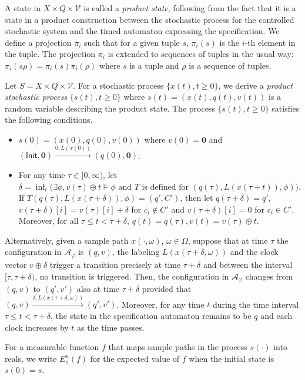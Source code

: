 \documentclass[letterpaper, 10 pt, conference]{ieeeconf}
\newcommand{\calA}{\mathcal{A}}
\newcommand{\calV}{\mathcal{V}}
\newcommand{\init}{\mathsf{Init}}
\begin{document}
A state in $X\times Q\times \calV$ is called a \emph{product state},
following from the fact that it is a state in a product construction
between the stochastic process for the controlled stochastic system
and the timed automaton expressing the specification. We define a
projection $\pi_i$ such that for a given tuple $s$, $\pi_i(s)$ is the
$i$-th element in the tuple. The projection $\pi_i$ is extended to
sequences of tuples in the usual way:
$\pi_i(s\rho)= \pi_i(s)\pi_i(\rho)$ where $s$ is a tuple and $\rho$ is
a sequence of tuples.

Let $S= X\times Q\times \calV$. For a stochastic process
$\{x(t), t\ge 0 \}$, we derive a \emph{product stochastic process}
$\{s(t), t\ge 0\}$ where $s(t)= (x(t), q(t), v(t))$ is a random
variable describing the product state. The process $\{s(t), t\ge 0
\}$ satisfies the following conditions.
\begin{itemize}
\item $s(0)= (x(0), q(0),v(0))$ where $v(0) =\bm 0$ and
  $(\init,\bm 0 )\xrightarrow{0, L(x(0))}(q(0),\bm 0)$.
\item For any time $\tau \in [0,\infty)$, let
  $\delta= \inf_t\big(\exists \phi, v(\tau)\oplus t \models \phi
  \text{ and } T \text{ is defined for }(q(\tau), L(x(\tau+t)),
  \phi)\big)$.
  If $T(q(\tau), L(x(\tau+\delta)), \phi)=(q',C')$, then let
  $q(\tau+\delta)=q'$, $v(\tau+\delta)[i]=v(\tau)[i]+\delta$ for
  $c_i \notin C'$ and $v(\tau+\delta)[i]=0$ for $c_i\in C'$. Moreover,
  for all $\tau \le t < \tau + \delta$,
  $q(t)=q(\tau), v(t)=v(\tau)\oplus t$.
\end{itemize}

Alternatively, given a sample path $x(\cdot,\omega)$,
$\omega \in \Omega$, suppose that at time $\tau$ the configuration in
$\calA_\varphi$ is $(q,v)$, the labeling $L(x(\tau+\delta,\omega))$
and the clock vector $v\oplus \delta$ trigger a transition precisely
at time $\tau+\delta$ and between the interval $[\tau, \tau+\delta)$,
no transition is triggered. Then, the configuration in $\calA_\varphi$
changes from $(q,v)$ to $(q',v')$ also at time $\tau+\delta$ provided
that $(q,v) \xrightarrow{\delta, L(x(\tau+\delta, \omega))} (q',v')$.
Moreover, for any time $t$ during the time interval
$ \tau \le t < \tau+\delta$, the state in the specification automaton
remains to be $q$ and each clock increases by $t$ as the time passes.

For a measurable function $f$ that maps sample paths in the process
$s(\cdot)$ into reals, we write $E_s^u(f)$ for the expected value of
$f$ when the initial state is $s(0)=s$.
\end{document}
